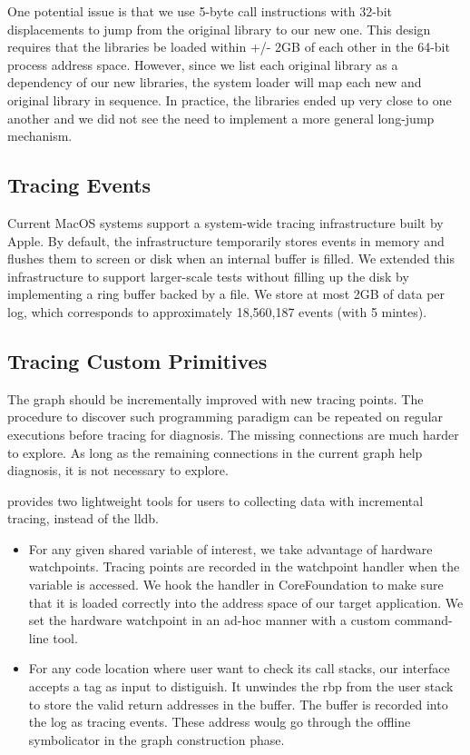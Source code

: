 One potential issue is that we use 5-byte call instructions with 32-bit displacements to jump from the original library to our new one.
This design requires that the libraries be loaded within +/- 2GB of each other in the 64-bit process address space.
However, since we list each original library as a dependency of our new libraries, the system loader will map each new and original library in sequence.
In practice, the libraries ended up very close to one another and we did not see the need to implement a more general long-jump mechanism.

\subsection{Tracing Events}
Current MacOS systems support a system-wide tracing infrastructure built by Apple.
By default, the infrastructure temporarily stores events in memory and flushes them to screen or disk when an internal buffer is filled.
We extended this infrastructure to support larger-scale tests without filling up the disk by implementing a ring buffer backed by a file.
We store at most 2GB of data per log, which corresponds to approximately 18,560,187 events (with 5 mintes).

\subsection{Tracing Custom Primitives} \label{subsec:tcp}
The graph should be incrementally improved with new tracing points.
The procedure to discover such programming paradigm can be repeated on regular executions before tracing for diagnosis.
The missing connections are much harder to explore.
As long as the remaining connections in the current graph help diagnosis, it is not necessary to explore.

\xxx provides two lightweight tools for users to collecting data with incremental tracing, instead of the lldb.
\begin {itemize}
\item For any given shared variable of interest, we take advantage of hardware watchpoints.
	Tracing points are recorded in the watchpoint handler when the variable is accessed.
	We hook the handler in CoreFoundation to make sure that it is loaded correctly into the address space of our target application.
	We set the hardware watchpoint in an ad-hoc manner with a custom command-line tool.
\item For any code location where user want to check its call stacks, our interface accepts a tag as input to distiguish.
	It unwindes the rbp from the user stack to store the valid return addresses in the buffer. The buffer is recorded into the log as tracing events.
	These address woulg go through the offline symbolicator in the graph construction phase.
\end{itemize}


